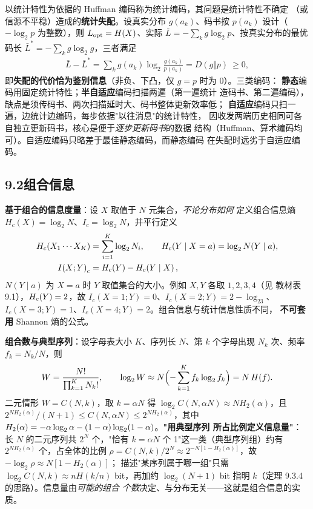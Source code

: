 以统计特性为依据的 Huffman 编码称为统计编码，其问题是统计特性不确定
（或信源不平稳）造成的\textbf{统计失配}。设真实分布 $g(a_k)$、码书按
$p(a_k)$ 设计（$-\log_2p$ 为整数），则 $L_{\rm opt}=H\!\left(X\right)$、实际
$\bar L=-\sum_kg\log_2p$、按真实分布的最优码长
$\bar L^{*}=-\sum_kg\log_2g$，三者满足
\begin{align*}
\bar L-\bar L^{*}=\sum_{k}g(a_k)\log_2\frac{g(a_k)}{p(a_k)}=D(g\Vert p)\ \ge0,
\end{align*}
即\textbf{失配的代价恰为鉴别信息}（非负、下凸，仅 $g=p$ 时为 0）。三类编码：
\textbf{静态}编码用固定统计特性；\textbf{半自适应}编码扫描两遍（第一遍统计
造码书、第二遍编码），缺点是须传码书、两次扫描延时大、码书整体更新效率低；
\textbf{自适应}编码只扫一遍，边统计边编码，每步依据"以往消息"的统计特性，
因收发两端历史相同可各自独立更新码书，核心是便于\emph{逐步更新码书}的数据
结构（Huffman、算术编码均可）。自适应编码只略差于最佳静态编码，而静态编码
在失配时远劣于自适应编码。

\subsection{9.2\quad 组合信息}

\textbf{基于组合的信息度量}：设 $X$ 取值于 $N$ 元集合，\emph{不论分布如何}
定义组合信息熵 $H_c(X)=\log_2N$、$I_c=\log_2N$，并平行定义
\begin{align*}
H_{c}\!\left(X_1\cdots X_K\right)&=\sum_{i=1}^{K}\log_2N_i,\qquad
H_{c}\!\left(Y\mid X=a\right)=\log_2N(Y\mid a),\\
I\!\left(X;Y\right)_c&=H_{c}\!\left(Y\right)-H_{c}\!\left(Y\mid X\right),
\end{align*}
$N(Y\mid a)$ 为 $X=a$ 时 $Y$ 取值集合的大小。例如 $X,Y$ 各取 $1,2,3,4$（见
教材表 9.1），$H_{c}\!\left(Y\right)=2$，故 $I_c(X{=}1;Y)=0$、$I_c(X{=}2;Y)=2-\log_23$、
$I_c(X{=}3;Y)=1$、$I_c(X{=}4;Y)=2$。组合信息与统计信息性质不同，
\textbf{不可套用} Shannon 熵的公式。

\textbf{组合数与典型序列}：设字母表大小 $K$、序列长 $N$、第 $k$ 个字母出现
$N_k$ 次、频率 $f_k=N_k/N$，则
\begin{align*}
W=\frac{N!}{\prod_{k=1}^{K}N_k!},\qquad
\log_2W\approx N\Bigl(-\sum_{k=1}^{K}f_k\log_{2} f_k\Bigr)=N\,H(f).
\end{align*}
二元情形 $W=C(N,k)$，取 $k=\alpha N$ 得
$\log_2C(N,\alpha N)\approx NH_2(\alpha)$，且
$2^{NH_2(\alpha)}/(N+1)\le C(N,\alpha N)\le2^{NH_2(\alpha)}$，其中
$H_2(\alpha)=-\alpha\log_{2}\alpha-(1-\alpha)\log_{2}(1-\alpha)$。\textbf{"用典型序列
所占比例定义信息量"}：长 $N$ 的二元序列共 $2^{N}$ 个，"恰有 $k=\alpha N$ 个
1"这一类（典型序列组）约有 $2^{NH_2(\alpha)}$ 个，占全体的比例
$\rho=C(N,k)/2^{N}\approx2^{-N[1-H_2(\alpha)]}$，故
$-\log_2\rho\approx N[1-H_2(\alpha)]$；
描述"某序列属于哪一组"只需 $\log_2C(N,k)\approx nH(k/n)$ bit，再加约
$\log_2(N+1)$ bit 指明 $k$（定理 9.3.4 的思路）。信息量由\emph{可能的组合
个数}决定、与分布无关——这就是组合信息的实质。

